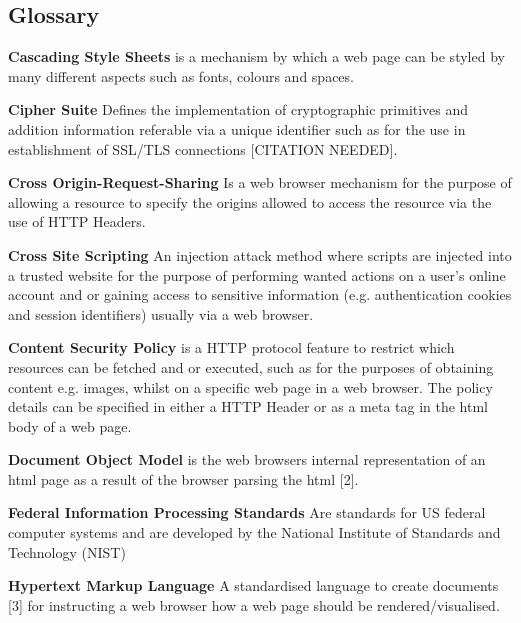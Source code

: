 \documentclass{mscreport}
\begin{document}
\newpage

\begin{center}
\section*{Glossary}
\end{center}

\begin{hangparas}{.25in}{1}
\textbf{Cascading Style Sheets} is a mechanism by which a web page can be styled by many different aspects such as fonts, colours and spaces. \par
\textbf{Cipher Suite} Defines the implementation of cryptographic primitives and addition information referable via a unique identifier such as  for the use in establishment of SSL/TLS connections [CITATION NEEDED]. \par
\textbf{Cross Origin-Request-Sharing} Is a web browser mechanism for the purpose of allowing a resource to specify the origins allowed to access the resource via the use of HTTP Headers. \par
\textbf{Cross Site Scripting} An injection attack method where scripts are injected into a trusted website for the purpose of performing wanted actions on a user’s online account and or gaining access to sensitive information (e.g. authentication cookies and session identifiers) usually via a web browser. \par
\textbf{Content Security Policy} is a HTTP protocol feature to restrict which resources can be fetched and or executed, such as for the purposes of obtaining content e.g. images, whilst on a specific web page in a web browser. The policy details can be specified in either a HTTP Header or as a meta tag in the html body of a web page. \par
\vspace{0.5cm}
\textbf{Document Object Model} is the web browsers internal representation of an html page as a result of the browser parsing the html [2]. \par
\vspace{0.5cm}
\textbf{Federal Information Processing Standards} Are standards for US federal computer systems and are developed by the National Institute of Standards and Technology (NIST) \par
\vspace{0.5cm}
\textbf{Hypertext Markup Language} A standardised language to create documents [3] for instructing a web browser how a web page should be rendered/visualised. \par

\end{hangparas}
\end{document}
